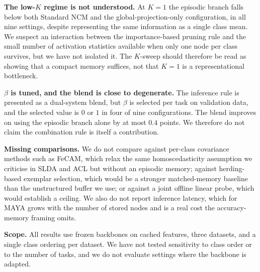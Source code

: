 \textbf{The low-$K$ regime is not understood.} At $K{=}1$ the episodic branch falls below both Standard NCM and the global-projection-only configuration, in all nine settings, despite representing the same information as a single class mean. We suspect an interaction between the importance-based pruning rule and the small number of activation statistics available when only one node per class survives, but we have not isolated it. The $K$-sweep should therefore be read as showing that a compact memory suffices, not that $K{=}1$ is a representational bottleneck.

\textbf{$\beta$ is tuned, and the blend is close to degenerate.} The inference rule is presented as a dual-system blend, but $\beta$ is selected per task on validation data, and the selected value is $0$ or $1$ in four of nine configurations. The blend improves on using the episodic branch alone by at most $0.4$ points. We therefore do not claim the combination rule is itself a contribution.

\textbf{Missing comparisons.} We do not compare against per-class covariance methods such as FeCAM, which relax the same homoscedasticity assumption we criticise in SLDA and ACL but without an episodic memory; against herding-based exemplar selection, which would be a stronger matched-memory baseline than the unstructured buffer we use; or against a joint offline linear probe, which would establish a ceiling. We also do not report inference latency, which for MAYA grows with the number of stored nodes and is a real cost the accuracy-memory framing omits.

\textbf{Scope.} All results use frozen backbones on cached features, three datasets, and a single class ordering per dataset. We have not tested sensitivity to class order or to the number of tasks, and we do not evaluate settings where the backbone is adapted.
